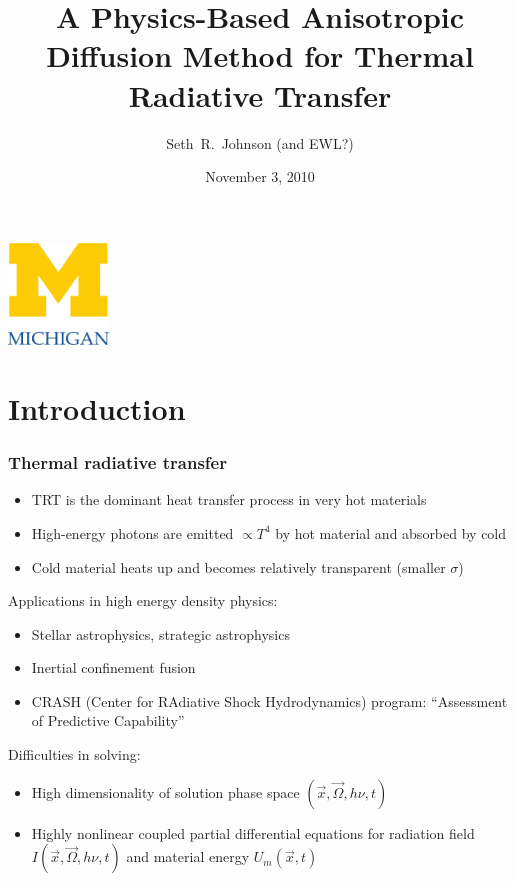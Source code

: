 \documentclass{beamer}
\title[Thesis Prospectus]%
{A Physics-Based Anisotropic Diffusion Method for Thermal Radiative
Transfer}
\author[Seth~R.~Johnson]{Seth~R.~Johnson (and EWL?)}
\institute[UMich]{
University of Michigan, Ann Arbor
}
\date[11/3/2010]{November 3, 2010}
\begin{document}

\begin{frame}
\titlepage
\begin{center}
  \includegraphics[width=0.2\textwidth]{../figures/umlogo}
\end{center}
\end{frame}

\section{Introduction}
\begin{frame}
  \frametitle{Thermal radiative transfer}
  \begin{itemize}
    \item TRT is the dominant heat transfer process in very hot materials
    \item High-energy photons are emitted $\propto T^4$ by hot material and
      absorbed by cold
    \item Cold material heats up and becomes relatively transparent (smaller
      $\sigma$)
  \end{itemize}

  Applications in high energy density physics:
  \begin{itemize}
    \item Stellar astrophysics, strategic astrophysics
    \item Inertial confinement fusion
    \item CRASH (Center for RAdiative Shock Hydrodynamics) program: ``Assessment
          of Predictive Capability''
  \end{itemize}
  Difficulties in solving:
  \begin{itemize}
    \item High dimensionality of solution phase space $(\vec{x}, \vec{\Omega},
      h\nu, t)$
    \item Highly nonlinear coupled partial differential equations for radiation
      field $I(\vec{x}, \vec{\Omega}, h\nu, t)$ and material energy $U_m(\vec{x}, t)$
  \end{itemize}
\end{frame}
\end{document}
